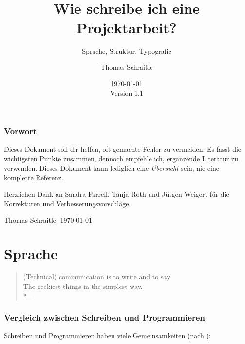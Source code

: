 \documentclass[a4paper,titlepage=true,twoside]{scrartcl}
\title{\hspace{0pt}\\[2ex]Wie schreibe ich eine Projektarbeit?}
\subtitle{Sprache, Struktur, Typografie}
\author{Thomas Schraitle\\\email{toms@suse.de}}
\date{\today\\Version 1.1}
\newenvironment{epigraph}[1]%
{\sbox{\Epigraph}{\textit{#1}}
\begin{quote}}%
{%
\\*\hspace{0pt}---\usebox{\Epigraph}%
\end{quote}}
\begin{document}
\maketitle
\tableofcontents

\section*{Vorwort}
Dieses Dokument soll dir helfen, oft gemachte Fehler zu vermeiden.
Es fasst die wichtigsten Punkte zusammen, dennoch empfehle ich, 
ergänzende Literatur zu verwenden. Dieses Dokument kann
lediglich eine \emph{Übersicht} sein, nie eine komplette Referenz.

Herzlichen Dank an Sandra Farrell, Tanja Roth und Jürgen Weigert
für die Korrekturen und Verbesserungsvorschläge.

\vspace{1.5em}
\noindent Thomas Schraitle, \today


\newpage
\part{Sprache}
\begin{epigraph}{Isaac Goldberg}
 (Technical) communication is to write and to say\\
 The geekiest things in the simplest way.
\end{epigraph}

\section{Vergleich zwischen Schreiben und Programmieren}
Schreiben und Programmieren haben viele Gemeinsamkeiten (nach \cite{bib.rosenberg}):
\end{document}
